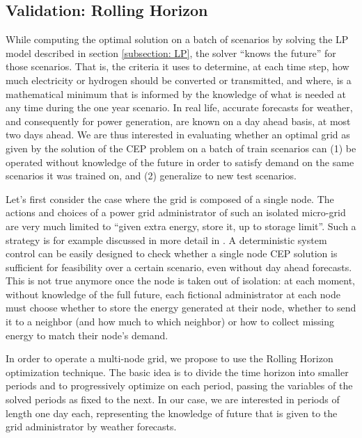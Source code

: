 \subsection{Validation: Rolling Horizon}\label{subsection: RH}

While computing the optimal solution on a batch of scenarios by solving the LP model described in section \ref{subsection: LP}, the solver ``knows the future'' for those scenarios. 
That is, the criteria it uses to determine, at each time step, how much electricity or hydrogen should be converted or transmitted, and where, is a mathematical minimum that is informed by the knowledge of what is needed at any time during the one year scenario.
In real life, accurate forecasts for weather, and consequently for power generation, are known on a day ahead basis, at most two days ahead. 
We are thus interested in evaluating whether an optimal grid as given by the solution of the CEP problem on a batch of train scenarios can (1) be operated without knowledge of the future in order to satisfy demand on the same scenarios it was trained on, and (2) generalize to new test scenarios.

Let's first consider the case where the grid is composed of a single node. 
The actions and choices of a power grid administrator of such an isolated micro-grid are very much limited to ``given extra energy, store it, up to storage limit''. 
Such a strategy is for example discussed in more detail in \textcolor{green}{\cite{deterministic}}. 
A deterministic system control can be easily designed to check whether a single node CEP solution is sufficient for feasibility over a certain scenario, even without day ahead forecasts.
This is not true anymore once the node is taken out of isolation: at each moment, without knowledge of the full future, each fictional administrator at each node must choose whether to store the energy generated at their node, whether to send it to a neighbor (and how much to which neighbor) or how to collect missing energy to match their node's demand.

In order to operate a multi-node grid, we propose to use the Rolling Horizon optimization technique. 
The basic idea is to divide the time horizon into smaller periods and to progressively optimize on each period, passing the variables of the solved periods as fixed to the next. 
In our case, we are interested in periods of length one day each, representing the knowledge of future that is given to the grid administrator by weather forecasts.

